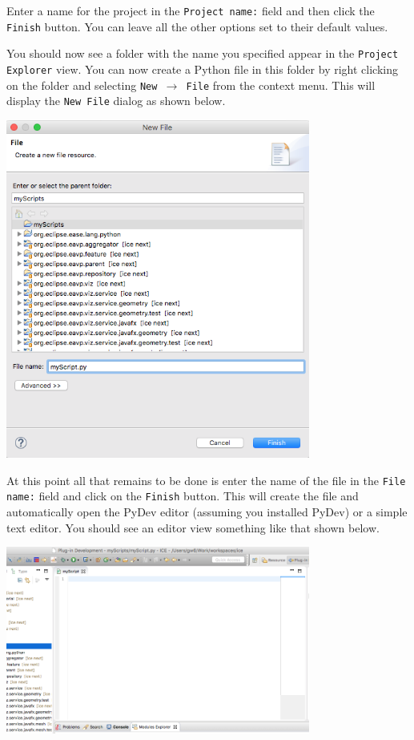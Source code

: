 Enter a name for the project in the \texttt{Project name:} field and then click the
\texttt{Finish} button. You can leave all the other options set to their default
values.

You should now see a folder with the name you specified appear in the
\texttt{Project Explorer} view. You can now create a Python file in this folder by
right clicking on the folder and selecting \texttt{New $\rightarrow$ File} from
the context menu. This will display the \texttt{New File} dialog as shown below.

\begin{center}
\includegraphics[width=10cm]{images/newfile}
\end{center}

At this point all that remains to be done is enter the name of the file in the
\texttt{File name:} field and click on the \texttt{Finish} button. This will
create the file and automatically open the PyDev editor (assuming you installed
PyDev) or a simple text editor. You should see an editor view something like
that shown below.

\begin{center}
\includegraphics[width=10cm]{images/editor}
\end{center}


